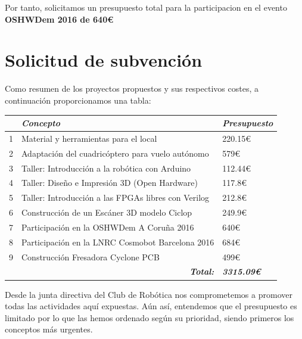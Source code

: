 \documentclass[12pt,twoside]{report}
\begin{document}
Por tanto, solicitamos un presupuesto total para la participacion en el evento {\bf OSHWDem 2016 de 640\euro{}}







\newpage



\section{Solicitud de subvención}


Como resumen de los proyectos propuestos y sus respectivos costes, a continuación proporcionamos una tabla:


\begin{tabular}{|l|l|l|}
\hline
 & \textit{\textbf{Concepto}}                          & \textit{\textbf{Presupuesto}} \\ \hline
1 & Material y herramientas para el local               & 220.15\euro{} \\ \hline
2 & Adaptación del cuadricóptero para vuelo autónomo    & 579\euro{} \\ \hline
3 & Taller: Introducción a la robótica con Arduino      & 112.44\euro{} \\ \hline
4 & Taller: Diseño e Impresión 3D (Open Hardware)       & 117.8\euro{} \\ \hline
5 & Taller: Introducción a las FPGAs libres con Verilog & 212.8\euro{} \\ \hline
6 & Construcción de un Escáner 3D modelo Ciclop         & 249.9\euro{} \\ \hline
7 & Participación en la OSHWDem A Coruña 2016            & 640\euro{} \\ \hline
8 & Participación en la LNRC Cosmobot Barcelona 2016    & 684\euro{} \\ \hline
9 & Construcción Fresadora Cyclone PCB                  & 499\euro{} \\ \hline
 & \multicolumn{1}{|r|}{\textit{\textbf{Total:}}}      & \textit{\textbf{3315.09\euro{}}}         \\ \hline
\end{tabular}


Desde la junta directiva del Club de Robótica nos comprometemos a promover todas las actividades aquí expuestas. Aún así, entendemos que el presupuesto es limitado por lo que las hemos ordenado según su prioridad, siendo primeros los conceptos más urgentes.
\end{document}
